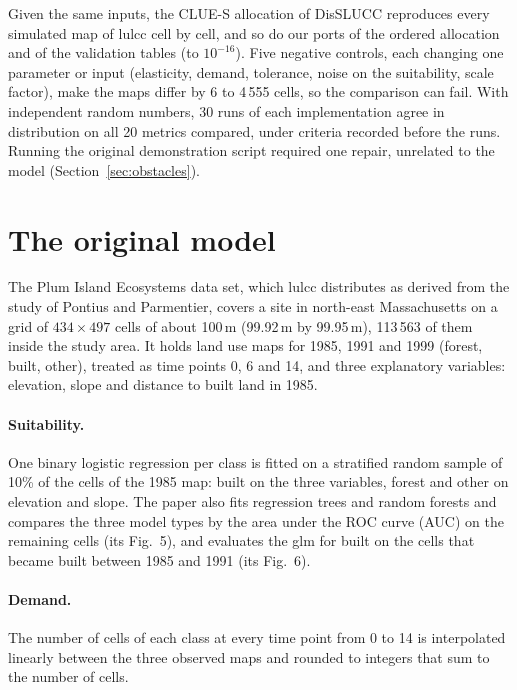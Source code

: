 Given the same inputs, the CLUE-S allocation of DisSLUCC reproduces every simulated map
of lulcc cell by cell, and so do our ports of the ordered allocation and of the
validation tables (to $10^{-16}$). Five negative controls, each changing one
parameter or input (elasticity, demand, tolerance, noise on the suitability, scale
factor), make the maps differ by 6 to 4\,555 cells, so the comparison can fail. With
independent random numbers, 30 runs of each implementation agree in distribution on all
20 metrics compared, under criteria recorded before the runs. Running the original
demonstration script required one repair, unrelated to the model
(Section~\ref{sec:obstacles}).

\section{The original model}
\label{sec:model}

The Plum Island Ecosystems data set, which lulcc distributes as derived from the study of
Pontius and Parmentier\supercite{Pontius:2014}, covers a site in north-east
Massachusetts on a grid of $434 \times 497$ cells of about 100\,m (99.92\,m by
99.95\,m), 113\,563 of them inside the study area. It holds land use maps for 1985,
1991 and 1999 (forest, built, other), treated as time points 0, 6 and 14, and three
explanatory variables: elevation, slope and distance to built land in 1985.

\paragraph{Suitability.} One binary logistic regression per class is fitted on a
stratified random sample of 10\% of the cells of the 1985 map: built on the three
variables, forest and other on elevation and slope. The paper also fits regression
trees and random forests and compares the three model types by the area under the
ROC curve (AUC) on the remaining cells (its Fig.~5), and evaluates the glm for built
on the cells that became built between 1985 and 1991 (its Fig.~6).

\paragraph{Demand.} The number of cells of each class at every time point from 0 to
14 is interpolated linearly between the three observed maps and rounded to integers
that sum to the number of cells.

